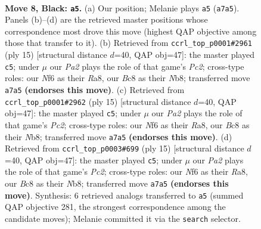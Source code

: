 \documentclass[11pt]{article}
\begin{document}
\begin{figure}[p]\centering
\begin{subfigure}{0.46\textwidth}\centering
\resizebox{\linewidth}{!}{%
\newchessgame
\chessboard[
  setfen={rnbq1rk1/pp2bppp/4pn2/2p5/2P4P/5NP1/P2PPPB1/RNBQ1RK1 b - - 0 8},
  showmover=false,
  pgfstyle=straightmove, color=movearrow, markmove={a7-a5}
]}
\caption{}
\end{subfigure}\hfill
\begin{subfigure}{0.46\textwidth}\centering
\resizebox{\linewidth}{!}{%
\newchessgame
\chessboard[
  setfen={rnbq1rk1/ppp1ppbp/5np1/8/3P4/N1P2NP1/P3PPBP/R1BQ1RK1 b - - 0 8},
  showmover=false,
  pgfstyle=straightmove, color=movearrow, markmove={c7-c5}
]}
\caption{}
\end{subfigure}
\\[4pt]
\begin{subfigure}{0.46\textwidth}\centering
\resizebox{\linewidth}{!}{%
\newchessgame
\chessboard[
  setfen={rnbq1rk1/ppp1ppbp/5np1/8/3P4/N1P2NP1/P3PPBP/R1BQ1RK1 b - - 0 8},
  showmover=false,
  pgfstyle=straightmove, color=movearrow, markmove={c7-c5}
]}
\caption{}
\end{subfigure}\hfill
\begin{subfigure}{0.46\textwidth}\centering
\resizebox{\linewidth}{!}{%
\newchessgame
\chessboard[
  setfen={rnbq1rk1/ppp1ppbp/5np1/8/3P4/N1P2NP1/P3PPBP/R1BQ1RK1 b - - 0 8},
  showmover=false,
  pgfstyle=straightmove, color=movearrow, markmove={c7-c5}
]}
\caption{}
\end{subfigure}
\caption{\textbf{Move 8, Black: \texttt{a5}.} (a) Our position; Melanie plays \texttt{a5} (\texttt{a7a5}). Panels (b)--(d) are the retrieved master positions whose correspondence most drove this move (highest QAP objective among those that transfer to it). (b) Retrieved from \texttt{ccrl\_top\_p0001\#2961} (ply 15) [structural distance $d$=40, QAP obj=47]: the master played \texttt{c5}; under $\mu$ our \emph{Pa2} plays the role of that game's \emph{Pc2}; cross-type roles: our \emph{N}f6 as their \emph{R}a8, our \emph{B}c8 as their \emph{N}b8; transferred move \texttt{a7a5} \textbf{(endorses this move)}. (c) Retrieved from \texttt{ccrl\_top\_p0001\#2962} (ply 15) [structural distance $d$=40, QAP obj=47]: the master played \texttt{c5}; under $\mu$ our \emph{Pa2} plays the role of that game's \emph{Pc2}; cross-type roles: our \emph{N}f6 as their \emph{R}a8, our \emph{B}c8 as their \emph{N}b8; transferred move \texttt{a7a5} \textbf{(endorses this move)}. (d) Retrieved from \texttt{ccrl\_top\_p0003\#699} (ply 15) [structural distance $d$=40, QAP obj=47]: the master played \texttt{c5}; under $\mu$ our \emph{Pa2} plays the role of that game's \emph{Pc2}; cross-type roles: our \emph{N}f6 as their \emph{R}a8, our \emph{B}c8 as their \emph{N}b8; transferred move \texttt{a7a5} \textbf{(endorses this move)}. Synthesis: 6 retrieved analogs transferred to \texttt{a5} (summed QAP objective 281, the strongest correspondence among the candidate moves); Melanie committed it via the \texttt{search} selector.}
\label{fig:thought-m15}
\end{figure}
\end{document}

